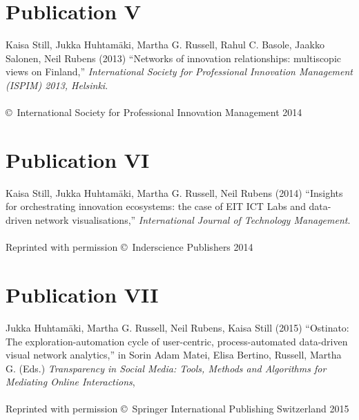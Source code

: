 

\chapter*{Publication V}
\thispagestyle{empty}
Kaisa Still, Jukka Huhtamäki, Martha G. Russell, Rahul C. Basole, Jaakko Salonen, Neil Rubens
(2013)
``Networks of innovation relationships: multiscopic views on Finland,''
\emph{International Society for Professional Innovation Management (ISPIM) 2013, Helsinki}.
\\\\
\noindent\copyright\ International Society for Professional Innovation Management 2014 



\chapter*{Publication VI}
\thispagestyle{empty}
 Kaisa Still, Jukka Huhtamäki, Martha G. Russell, Neil Rubens
(2014)
``Insights for orchestrating innovation ecosystems: the case of EIT ICT Labs and data-driven network visualisations,''
\emph{International Journal of Technology Management}.
\\\\
\noindent Reprinted with permission \copyright\ Inderscience Publishers 2014 



\chapter*{Publication VII}
\thispagestyle{empty}
Jukka Huhtamäki, Martha G. Russell, Neil Rubens, Kaisa Still 
(2015) 	
``Ostinato: The exploration-automation cycle of user-centric, process-automated data-driven visual network analytics,'' in Sorin Adam Matei,
Elisa Bertino, Russell, Martha G. (Eds.) \emph{Transparency in Social Media: Tools, Methods and Algorithms for Mediating Online Interactions},
\\\\
\noindent Reprinted with permission \copyright\ Springer International Publishing Switzerland 2015


